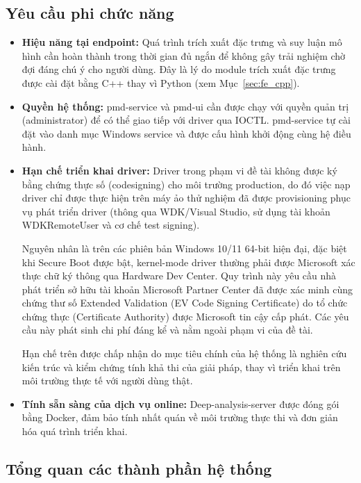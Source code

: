 \subsection{Yêu cầu phi chức năng}

\begin{itemize}
    \item \textbf{Hiệu năng tại endpoint:} Quá trình trích xuất đặc
        trưng và suy luận mô hình cần hoàn thành trong thời gian đủ
        ngắn để không gây trải nghiệm chờ đợi đáng chú ý cho người
        dùng. Đây là lý do module trích xuất đặc trưng được cài đặt
        bằng C++ thay vì Python (xem Mục~\ref{sec:fe_cpp}).
    \item \textbf{Quyền hệ thống:} pmd-service và pmd-ui cần được
        chạy với quyền quản trị (administrator) để có thể giao tiếp
        với driver qua IOCTL. pmd-service tự cài đặt vào danh mục
        Windows service và được cấu hình khởi động cùng hệ điều hành.
    \item \textbf{Hạn chế triển khai driver:} Driver trong phạm vi đề tài
    không được ký bằng chứng thực số (codesigning) cho môi
    trường production, do đó việc nạp driver chỉ được thực hiện trên
    máy ảo thử nghiệm đã được provisioning phục vụ phát triển driver
    (thông qua WDK/Visual Studio, sử dụng tài khoản WDKRemoteUser và
    cơ chế test signing).

    Nguyên nhân là trên các phiên bản Windows 10/11 64-bit hiện đại,
    đặc biệt khi Secure Boot được bật, kernel-mode driver thường phải
    được Microsoft xác thực chữ ký thông qua Hardware Dev Center.
    Quy trình này yêu cầu nhà phát triển sở hữu tài khoản Microsoft
    Partner Center đã được xác minh cùng chứng thư số Extended
    Validation (EV Code Signing Certificate) do tổ chức chứng thực
    (Certificate Authority) được Microsoft tin cậy cấp phát. Các yêu
    cầu này phát sinh chi phí đáng kể và nằm ngoài phạm vi của đề tài.

    Hạn chế trên được chấp nhận do mục tiêu chính của hệ thống là
    nghiên cứu kiến trúc và kiểm chứng tính khả thi của giải pháp,
    thay vì triển khai trên môi trường thực tế với người dùng thật.

    \item \textbf{Tính sẵn sàng của dịch vụ online:} Deep-analysis-server
        được đóng gói bằng Docker, đảm bảo tính nhất quán về môi
        trường thực thi và đơn giản hóa quá trình triển khai.
\end{itemize}

\subsection{Tổng quan các thành phần hệ thống}

